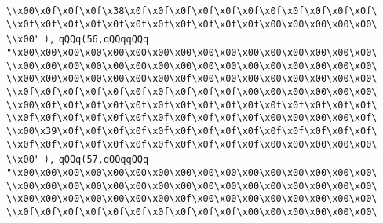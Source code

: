 \verb|\\x00\x0f\x0f\x0f\x38\x0f\x0f\x0f\x0f\x0f\x0f\x0f\x0f\x0f\x0f\x0f\|\newline
\verb|\\x0f\x0f\x0f\x0f\x0f\x0f\x0f\x0f\x0f\x0f\x0f\x00\x00\x00\x00\x00\|\newline
\verb|\\x00"|\newline
\verb|),|\newline
\verb|qQQq(56,qQQqqQQq|\newline
\verb|"\x00\x00\x00\x00\x00\x00\x00\x00\x00\x00\x00\x00\x00\x00\x00\x00\|\newline
\verb|\\x00\x00\x00\x00\x00\x00\x00\x00\x00\x00\x00\x00\x00\x00\x00\x00\|\newline
\verb|\\x00\x00\x00\x00\x00\x00\x00\x0f\x00\x00\x00\x00\x00\x00\x00\x00\|\newline
\verb|\\x0f\x0f\x0f\x0f\x0f\x0f\x0f\x0f\x0f\x0f\x00\x00\x00\x00\x00\x00\|\newline
\verb|\\x00\x0f\x0f\x0f\x0f\x0f\x0f\x0f\x0f\x0f\x0f\x0f\x0f\x0f\x0f\x0f\|\newline
\verb|\\x0f\x0f\x0f\x0f\x0f\x0f\x0f\x0f\x0f\x0f\x0f\x00\x00\x00\x00\x0f\|\newline
\verb|\\x00\x39\x0f\x0f\x0f\x0f\x0f\x0f\x0f\x0f\x0f\x0f\x0f\x0f\x0f\x0f\|\newline
\verb|\\x0f\x0f\x0f\x0f\x0f\x0f\x0f\x0f\x0f\x0f\x0f\x00\x00\x00\x00\x00\|\newline
\verb|\\x00"|\newline
\verb|),|\newline
\verb|qQQq(57,qQQqqQQq|\newline
\verb|"\x00\x00\x00\x00\x00\x00\x00\x00\x00\x00\x00\x00\x00\x00\x00\x00\|\newline
\verb|\\x00\x00\x00\x00\x00\x00\x00\x00\x00\x00\x00\x00\x00\x00\x00\x00\|\newline
\verb|\\x00\x00\x00\x00\x00\x00\x00\x0f\x00\x00\x00\x00\x00\x00\x00\x00\|\newline
\verb|\\x0f\x0f\x0f\x0f\x0f\x0f\x0f\x0f\x0f\x0f\x00\x00\x00\x00\x00\x00\|\newline
